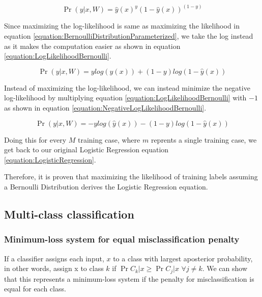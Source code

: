\documentclass[a4paper,12pt]{article}
\begin{document}
\begin{equation}
\label{equation:BernoulliDistributionParameterized}
\Pr(y|x, W) = \hat{y}(x)^{y}(1-\hat{y}(x))^{(1-y)}
\end{equation}

Since maximizing the log-likelihood is same as maximizing the likelihood in equation \ref{equation:BernoulliDistributionParameterized}, we take the log instead as it makes the computation easier as shown in equation \ref{equation:LogLikelihoodBernoulli}. 

\begin{equation}
\label{equation:LogLikelihoodBernoulli}
\Pr(y|x, W) = ylog(\hat{y}(x)) + (1-y)log(1-\hat{y}(x))
\end{equation}

Instead of maximizing the log-likelihood, we can instead minimize the negative log-likelihood by multiplying equation \ref{equation:LogLikelihoodBernoulli} with $-1$ as shown in equation
\ref{equation:NegativeLogLikelihoodBernoulli}. 

\begin{equation}
\label{equation:NegativeLogLikelihoodBernoulli}
\Pr(y|x, W) = -ylog(\hat{y}(x)) - (1-y)log(1-\hat{y}(x))
\end{equation}

Doing this for every $M$ training case, where $m$ reprents a single training case, we get back to our original Logistic Regression equation \ref{equation:LogisticRegression}. 

Therefore, it is proven that maximizing the likelihood of training labels assuming a Bernoulli Distribution derives the Logistic Regression equation. 

\clearpage
\subsection{Multi-class classification}
\subsubsection{Minimum-loss system for equal misclassification penalty}
If a classifier assigns each input, $x$ to a class with largest aposterior probability,
in other words, assign x to class $k$ if $\Pr{C_{k}|x} \ge \Pr{C_{j}|x}$ $\forall j \neq k$. 
We can show that this represents a minimum-loss system if the penalty for misclassification is equal for each class. 
\end{document}
